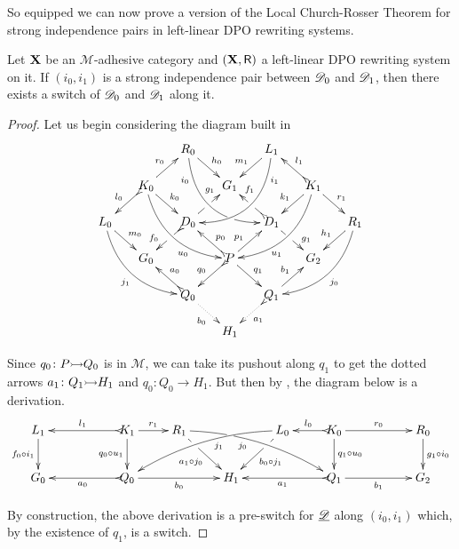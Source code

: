 So equipped we can now prove a version of the Local Church-Rosser Theorem for strong independence pairs in left-linear DPO rewriting systems.

\begin{theorem}\label{prChurch} Let $\textbf {\textup{X}}$ be an $\mathcal{M}$-adhesive category and $(\textbf {\textup{X}}, \mathsf{R})$ a left-linear DPO rewriting system on it. If $(i_0, i_1)$ is a strong independence pair
	between $\mathscr{D}_0$ and $\mathscr{D}_1$, then there exists a switch of $\mathscr{D}_0$ and $\mathscr{D}_1$ along it.
\end{theorem}
\begin{proof}
	Let us begin considering the diagram
	built in 
	\[\xymatrix@C=15pt@R=15pt{&&R_0
		\ar@/_.8cm/[ddrr]_(.2){i_0}|(.7)\hole \ar[dr]^{h_0}&&
		L_1\ar@/^.8cm/[ddll]^(.2){i_1}
		\ar[dl]_{m_1}\\&K_0\ar[dr]^{k_0}\ar@{>->}[dl]_{l_0}
		\ar@/_.6cm/[ddrr]_(.65){u_0}\ar[ur]^{r_0}&& G_1 && K_1
		\ar@/^.6cm/[ddll]^(.65){u_1}\ar[dl]_{k_1}\ar@{>->}[lu]_{l_1}
		\ar[dr]^{r_1}\\L_0 \ar[dr]^{m_0} \ar@{>}@/_.6cm/[ddrr]_{j_1}&& D_0
		\ar@{>->}[dl]|(.42)\hole_(.64){f_0}\ar[ur]|(.48)\hole^(.7){g_1}&&D_1
		\ar[dr]|(.42)\hole^(.65){g_1}
		\ar@{>->}[ul]|(.48)\hole_(.7){f_1}&&R_1\ar@/^.6cm/[ddll]^{j_0}\ar[dl]_{h_1}\\&G_0
		&&P\ar[dr]^{q_1}
		\ar@{>->}[dl]_{q_0}\ar[ur]^(.4){p_1}\ar@{>->}[ul]_(.4){p_0}&&G_2\\&&Q_0
		\ar@{>->}@{>->}[ul]_{a_0} \ar@{.>}[dr]_{b_0} &&Q_1\ar[ur]^{b_1}
		\ar@{>.>}[dl]^{a_1} \\ &&&H_1 }\] 
		
		Since $q_0\colon P\mto Q_0$ is in
	$\mathcal{M}$, we can take its pushout along $q_1$ to get the dotted
	arrows $a_1\colon Q_1\mto H_1$ and $q_0\colon Q_0\to H_1$. But then by , the diagram
	below is a derivation.
	\[\xymatrix{L_1 \ar[d]_{f_0 \circ i_1}&& K_1
		\ar[d]_{q_0\circ u_1}\ar@{>->}[ll]_{l_1} \ar[r]^{r_1} & R_1
		\ar@/^.35cm/[drrr]|(.31)\hole_(.4){j_0} \ar[dr]|(.3)\hole_{a_1\circ
			j_0} && L_0 \ar@/_.35cm/[dlll]^(.4){j_1} \ar[dl]|(.3)\hole^{b_0\circ
			j_1}& K_0 \ar[d]^{q_1\circ u_0}\ar@{>->}[l]_{l_0} \ar[rr]^{r_0} && R_0
		\ar[d]^{g_1\circ i_0} \\G_0 && \ar@{>->}[ll]^{a_0} Q_0 \ar[rr]_{b_0}&&
		H_1 && \ar@{>->}[ll]^{a_1} Q_1 \ar[rr]_{b_1}&& G_2}\] 
		
		By construction, the above derivation is a pre-switch for $\underline{\mathscr{D}}$ along $(i_0, i_1)$ which, by the existence of $q_1$, is a switch.
\end{proof}

